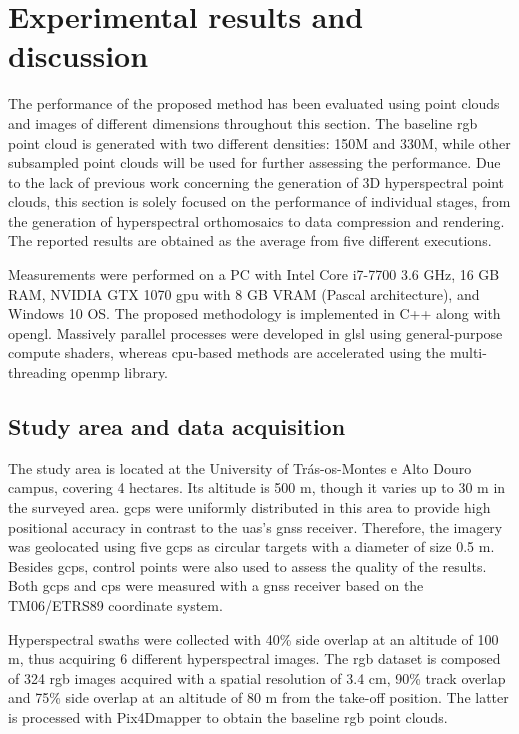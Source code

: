 \section{Experimental results and discussion}

The performance of the proposed method has been evaluated using point clouds and images of different dimensions throughout this section. The baseline \acrshort{rgb} point cloud is generated with two different densities: 150M and 330M, while other subsampled point clouds will be used for further assessing the performance. Due to the lack of previous work concerning the generation of 3D hyperspectral point clouds, this section is solely focused on the performance of individual stages, from the generation of hyperspectral orthomosaics to data compression and rendering. The reported results are obtained as the average from five different executions.

Measurements were performed on a PC with Intel Core i7-7700 3.6 GHz, 16 GB RAM, NVIDIA GTX 1070 \acrshort{gpu} with 8 GB VRAM (Pascal architecture), and Windows 10 OS. The proposed methodology is implemented in C++ along with \acrshort{opengl}. Massively parallel processes were developed in \acrshort{glsl} using general-purpose compute shaders, whereas \acrshort{cpu}-based methods are accelerated using the multi-threading \acrshort{openmp} library.

\subsection{Study area and data acquisition}

The study area is located at the University of Trás-os-Montes e Alto Douro campus, covering 4 hectares. Its altitude is 500 \si{\meter}, though it varies up to 30 \si{\meter} in the surveyed area. \acrshort{gcp}s were uniformly distributed in this area to provide high positional accuracy in contrast to the \acrshort{uas}’s \acrshort{gnss} receiver. Therefore, the imagery was geolocated using five \acrshort{gcp}s as circular targets with a diameter of size 0.5 \si{\meter}. Besides \acrshort{gcp}s, control points were also used to assess the quality of the results. Both \acrshort{gcp}s and \acrshort{cp}s were measured with a \acrshort{gnss} receiver based on the TM06/ETRS89 coordinate system.

Hyperspectral swaths were collected with 40\% side overlap at an altitude of 100 \si{\meter}, thus acquiring 6 different hyperspectral images. The \acrshort{rgb} dataset is composed of 324 \acrshort{rgb} images acquired with a spatial resolution of 3.4 \si{\centi\meter}, 90\% track overlap and 75\% side overlap at an altitude of 80 \si{\meter} from the take-off position. The latter is processed with Pix4Dmapper to obtain the baseline \acrshort{rgb} point clouds. 

